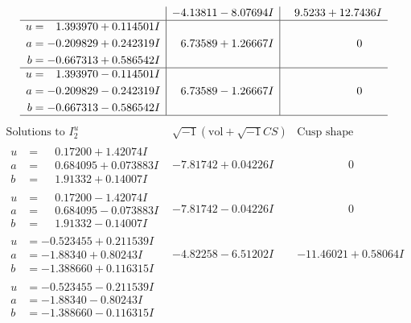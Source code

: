 \documentclass[1p]{elsarticle_modified}
\theoremstyle{definition}
\newcommand{\I}{\sqrt{-1}}
\begin{document}
$$\begin{array}{c|c|c}
 & -4.13811 - 8.07694 I & \phantom{-}9.5233 + 12.7436 I \\ \hline\begin{aligned}
u &= \phantom{-}1.393970 + 0.114501 I \\
a &= -0.209829 + 0.242319 I \\
b &= -0.667313 + 0.586542 I\end{aligned}
 & \phantom{-}6.73589 + 1.26667 I & \phantom{-0.000000 } 0 \\ \hline\begin{aligned}
u &= \phantom{-}1.393970 - 0.114501 I \\
a &= -0.209829 - 0.242319 I \\
b &= -0.667313 - 0.586542 I\end{aligned}
 & \phantom{-}6.73589 - 1.26667 I & \phantom{-0.000000 } 0\\
 \hline 
 \end{array}$$\newpage$$\begin{array}{c|c|c}  
\text{Solutions to }I^u_{2}& \I (\text{vol} + \sqrt{-1}CS) & \text{Cusp shape}\\
 \hline 
\begin{aligned}
u &= \phantom{-}0.17200 + 1.42074 I \\
a &= \phantom{-}0.684095 + 0.073883 I \\
b &= \phantom{-}1.91332 + 0.14007 I\end{aligned}
 & -7.81742 + 0.04226 I & \phantom{-0.000000 } 0 \\ \hline\begin{aligned}
u &= \phantom{-}0.17200 - 1.42074 I \\
a &= \phantom{-}0.684095 - 0.073883 I \\
b &= \phantom{-}1.91332 - 0.14007 I\end{aligned}
 & -7.81742 - 0.04226 I & \phantom{-0.000000 } 0 \\ \hline\begin{aligned}
u &= -0.523455 + 0.211539 I \\
a &= -1.88340 + 0.80243 I \\
b &= -1.388660 + 0.116315 I\end{aligned}
 & -4.82258 - 6.51202 I & -11.46021 + 0.58064 I \\ \hline\begin{aligned}
u &= -0.523455 - 0.211539 I \\
a &= -1.88340 - 0.80243 I \\
b &= -1.388660 - 0.116315 I\end{aligned}

\end{array}$$
\end{document}
